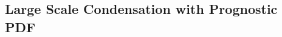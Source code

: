 \hypertarget{large-scale-condensation-with-prognostic-pdf}{%
\subsection{Large Scale Condensation with Prognostic
PDF}\label{large-scale-condensation-with-prognostic-pdf}}
